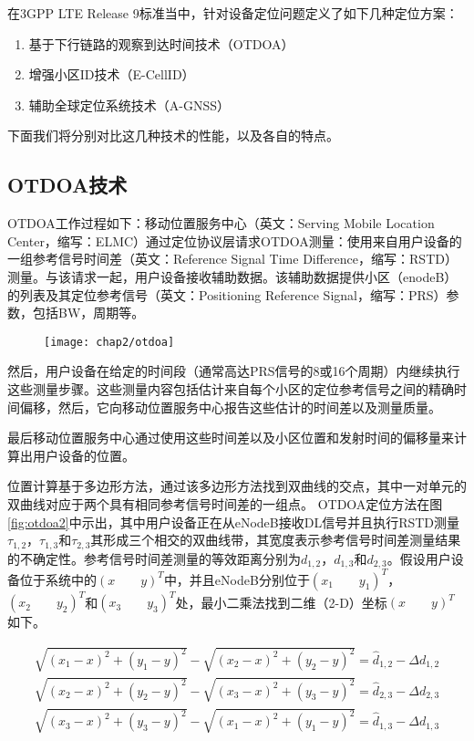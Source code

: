 在3GPP LTE Release 9标准当中，针对设备定位问题定义了如下几种定位方案：
\begin{enumerate}
    \item 基于下行链路的观察到达时间技术（OTDOA）
    \item 增强小区ID技术（E-CellID）
    \item 辅助全球定位系统技术（A-GNSS）
\end{enumerate}

下面我们将分别对比这几种技术的性能，以及各自的特点。

\subsection{OTDOA技术}

OTDOA工作过程如下：移动位置服务中心（英文：Serving Mobile Location Center，缩写：ELMC）通过定位协议层请求OTDOA测量：使用来自用户设备的一组参考信号时间差（英文：Reference Signal Time Difference，缩写：RSTD）测量。与该请求一起，用户设备接收辅助数据。该辅助数据提供小区（enodeB）的列表及其定位参考信号（英文：Positioning Reference Signal，缩写：PRS）参数，包括BW，周期等。

\begin{figure}[!htp]
  \centering
  \texttt{[image: chap2/otdoa]}
\end{figure}

然后，用户设备在给定的时间段（通常高达PRS信号的8或16个周期）内继续执行这些测量步骤。这些测量内容包括估计来自每个小区的定位参考信号之间的精确时间偏移，然后，它向移动位置服务中心报告这些估计的时间差以及测量质量。

最后移动位置服务中心通过使用这些时间差以及小区位置和发射时间的偏移量来计算出用户设备的位置。

位置计算基于多边形方法，通过该多边形方法找到双曲线的交点，其中一对单元的双曲线对应于两个具有相同参考信号时间差的一组点。 OTDOA定位方法在图\ref{fig:otdoa2}中示出，其中用户设备正在从eNodeB接收DL信号并且执行RSTD测量$\tau_{1,2}$，$\tau_{1,3}$和$\tau_{2,3}$其形成三个相交的双曲线带，其宽度表示参考信号时间差测量结果的不确定性。参考信号时间差测量的等效距离分别为$d_{1,2}$，$d_{1,3}$和$d_{2,3}$。假设用户设备位于系统中的$(x\qquad y)^T$中，并且eNodeB分别位于$(x_{1}\qquad y_{1})^T$，$(x_{2}\qquad y_{2})^T$和$(x_{3}\qquad y_{3})^T$处，最小二乘法找到二维（2-D）坐标$(x\qquad y)^T$如下。

{\setlength\abovedisplayskip{15pt}
\setlength\belowdisplayskip{15pt}
\begin{eqnarray}
    \label{eq:hyperbolic}
    \sqrt{(x_{1}-x)^2+(y_{1}-y)^2}-\sqrt{(x_{2}-x)^2+(y_{2}-y)^2}=\widehat{d}_{1,2}-\Delta d_{1,2} \nonumber \\
    \sqrt{(x_{2}-x)^2+(y_{2}-y)^2}-\sqrt{(x_{3}-x)^2+(y_{3}-y)^2}=\widehat{d}_{2,3}-\Delta d_{2,3}  \\
    \sqrt{(x_{3}-x)^2+(y_{3}-y)^2}-\sqrt{(x_{1}-x)^2+(y_{1}-y)^2}=\widehat{d}_{1,3}-\Delta d_{1,3} \nonumber
\end{eqnarray}}

